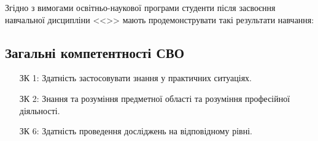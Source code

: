\documentclass{Syllabus}
\begin{document}
Згідно з вимогами освітньо-наукової програми
студенти після засвоєння навчальної дисципліни <<\discipline>> мають продемонструвати такі результати навчання:

\subsection*{Загальні компетентності СВО}

\begin{enumerate}
\item [ЗК 1:] Здатність застосовувати знання у практичних ситуаціях.
\item [ЗК 2:] Знання та розуміння предметної області та розуміння професійної діяльності.
\item [ЗК 6:] Здатність проведення досліджень на відповідному рівні.
\end{enumerate}
\end{document}
